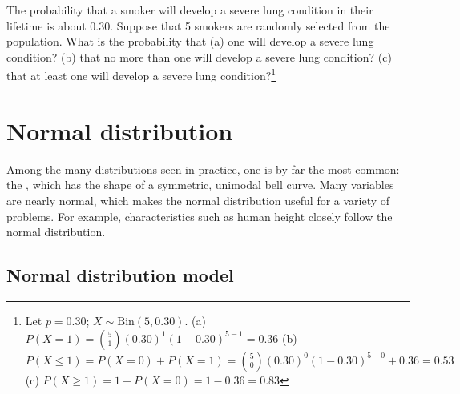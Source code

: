 \begin{exercise}
	The probability that a smoker will develop a severe lung condition in their lifetime is about 0.30. Suppose that 5 smokers are randomly selected from the population. What is the probability that (a) one will develop a severe lung condition? (b) that no more than one will develop a severe lung condition? (c) that at least one will develop a severe lung condition?\footnote{Let $p = 0.30$; $X \sim \textrm{Bin}(5, 0.30)$. (a) $P(X=1) = {5 \choose 1}(0.30)^1(1-0.30)^{5-1} = 0.36$ (b) $P(X \leq 1) = P(X=0) + P(X=1) = {5 \choose 0}(0.30)^0(1-0.30)^{5-0} + 0.36 = 0.53$ (c) $P(X \geq 1) = 1 - P(X=0) = 1 - 0.36 = 0.83$}	
\end{exercise}





\section{Normal distribution}
\label{normalDist}

Among the many distributions seen in practice, one is by far the most common: the , which has the shape of a symmetric, unimodal bell curve. Many variables are nearly normal, which makes the normal distribution useful for a variety of problems. For example, characteristics such as human height closely follow the normal distribution.

\subsection{Normal distribution model}

